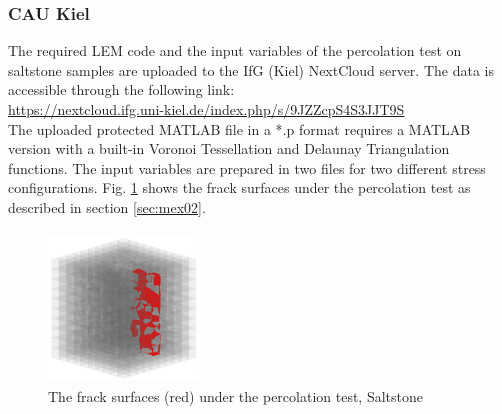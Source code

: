 \subsubsection*{CAU Kiel}

The required LEM code and the input variables of the percolation test on saltstone samples are uploaded to the IfG (Kiel) NextCloud server. The data is accessible through the following link:\\
\hyperlink{https://nextcloud.ifg.uni-kiel.de/index.php/s/9JZZcpS4S3JJT9S}{https://nextcloud.ifg.uni-kiel.de/index.php/s/9JZZcpS4S3JJT9S}\\

The uploaded protected MATLAB file in a *.p format requires a MATLAB version with a built-in Voronoi Tessellation and Delaunay Triangulation functions. The input variables are prepared in two files for two different stress configurations. Fig. \ref{fig:Amir_ME2_LEM_b_model_Fracture_Data} shows the frack surfaces under the percolation test as described in section \ref {sec:mex02}.

\begin{figure}[!ht]
\centering
\includegraphics[width=4cm,height=4cm]{figures/Amir_ME2_LEM_b_model_Fracture_Data.png}
\caption{The frack surfaces (red) under the percolation test, Saltstone}
\label{fig:Amir_ME2_LEM_b_model_Fracture_Data}
\end{figure}

